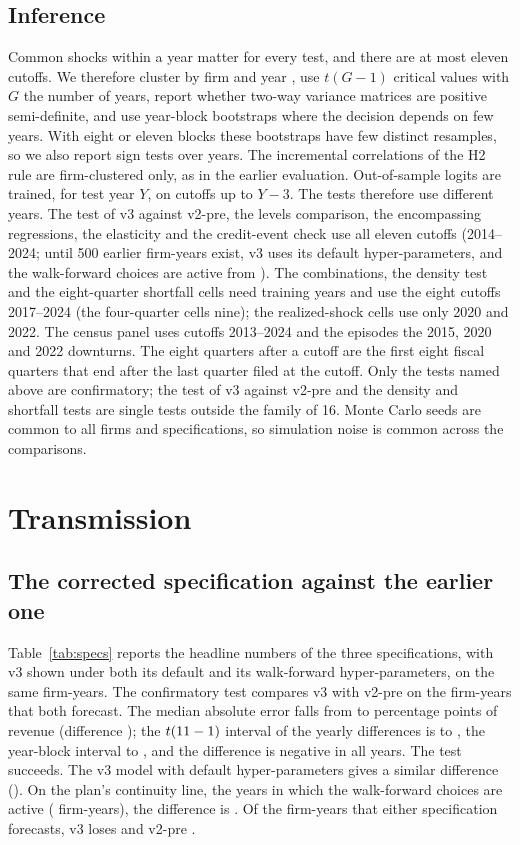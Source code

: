 \documentclass[preprint,12pt,authoryear]{elsarticle}
\begin{document}
\subsection{Inference}
Common shocks within a year matter for every test, and there are at most eleven cutoffs. We therefore cluster by firm and year \citep{cameron2011}, use $t(G-1)$ critical values with $G$ the number of years, report whether two-way variance matrices are positive semi-definite, and use year-block bootstraps where the decision depends on few years. With eight or eleven blocks these bootstraps have few distinct resamples, so we also report sign tests over years. The incremental correlations of the H2 rule are firm-clustered only, as in the earlier evaluation. Out-of-sample logits are trained, for test year $Y$, on cutoffs up to $Y-3$. The tests therefore use different years. The test of v3 against v2-pre, the levels comparison, the encompassing regressions, the elasticity and the credit-event check use all eleven cutoffs (2014--2024; until 500 earlier firm-years exist, v3 uses its default hyper-parameters, and the walk-forward choices are active from \SelYears). The combinations, the density test and the eight-quarter shortfall cells need training years and use the eight cutoffs 2017--2024 (the four-quarter cells nine); the realized-shock cells use only 2020 and 2022. The census panel uses cutoffs 2013--2024 and the episodes the 2015, 2020 and 2022 downturns. The eight quarters after a cutoff are the first eight fiscal quarters that end after the last quarter filed at the cutoff. Only the tests named above are confirmatory; the test of v3 against v2-pre and the density and shortfall tests are single tests outside the family of 16. Monte Carlo seeds are common to all firms and specifications, so simulation noise is common across the comparisons.

\section{Transmission}\label{sec:pillarA}

\subsection{The corrected specification against the earlier one}
Table~\ref{tab:specs} reports the headline numbers of the three specifications, with v3 shown under both its default and its walk-forward hyper-parameters, on the same \SpecN{} firm-years. The confirmatory test compares v3 with v2-pre on the \SOneN{} firm-years that both forecast. The median absolute error falls from \SOneMedVtwo{} to \SOneMedVthree{} percentage points of revenue (difference \SOneStat); the $t(11-1)$ interval of the yearly differences is \SOneLo{} to \SOneHi, the year-block interval \SOneBlockLo{} to \SOneBlockHi, and the difference is negative in all \SOneNeg{} years. The test succeeds. The v3 model with default hyper-parameters gives a similar difference (\SOneDefStat). On the plan's continuity line, the years \SOneContYears{} in which the walk-forward choices are active (\SOneContN{} firm-years), the difference is \SOneContStat. Of the firm-years that either specification forecasts, v3 loses \SOneLostThree{} and v2-pre \SOneLostTwo.
\end{document}
